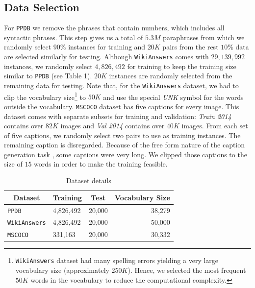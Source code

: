 \subsection{Data Selection}
For \texttt{PPDB} we remove the phrases that contain numbers, which includes all syntactic phrases. This step gives us a total of $5.3M$ paraphrases from which we randomly select $90\%$ instances for training and $20K$ pairs from the rest $10\%$ data are selected similarly for testing. Although \texttt{WikiAnswers} comes with $29,139,992$ instances, we randomly select $4,826,492$ for training to keep the training size similar to \texttt{PPDB} (see Table 1). $20K$ instances are randomly selected from the remaining data for testing. Note that, for the \texttt{WikiAnswers} dataset, we had to clip the vocabulary size\footnote{\texttt{WikiAnswers} dataset had many spelling errors yielding a very large vocabulary size (approximately $250K$). Hence, we selected the most frequent $50K$ words in the vocabulary to reduce the computational complexity.} to $50K$ and use the special \emph{UNK} symbol for the words outside the vocabulary. \texttt{MSCOCO} dataset has five captions for every image. This dataset comes with separate subsets for training and validation: \emph{Train 2014} contains over $82K$ images and \emph{Val 2014} contains over $40K$ images. From each set of five captions, we randomly select two pairs to use as training instances. The remaining caption is disregarded. Because of the free form nature of the caption generation task \cite{VinyalsTBE14}, some captions were very long. We clipped those captions to the size of $15$ words in order to make the training feasible.

\begin{table}
      \centering
    \begin{tabular}{lllr}
    \midrule
    \multicolumn{1}{c}{\textbf{Dataset}} & \multicolumn{1}{c}{\textbf{Training}} & \multicolumn{1}{c}{\textbf{Test}} & \multicolumn{1}{c}{\textbf{Vocabulary Size}}\\
    \midrule
    \texttt{PPDB}                        & 4,826,492                    & 20,000         & 38,279          \\
    \texttt{WikiAnswers}                 & 4,826,492                    & 20,000         & 50,000          \\
    \texttt{MSCOCO}                      & 331,163                      & 20,000         & 30,332         \\
    \midrule
    \end{tabular}
     \caption{Dataset details}
\end{table}

